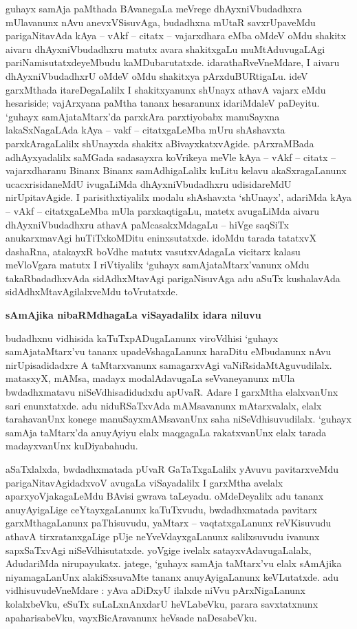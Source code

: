 guhayx samAja paMthada BAvanegaLa meVrege dhAyxniVbudadhxra mUlavanunx nAvu anevxVSisuvAga, budadhxna mUtaR savxrUpaveMdu parigaNitavAda kAya -- vAkf -- citatx -- vajarxdhara eMba oMdeV oMdu shakitx aivaru dhAyxniVbudadhxru matutx avara shakitxgaLu muMtAduvugaLAgi pariNamisutatxdeyeMbudu kaMDubarutatxde. idarathaRveVneMdare, I aivaru dhAyxniVbudadhxrU oMdeV oMdu shakitxya pArxduBURtigaLu. ideV garxMthada itareDegaLalilx I shakitxyanunx shUnayx athavA vajarx eMdu hesariside; vajArxyana paMtha tananx hesaranunx idariMdaleV paDeyitu. `guhayx samAjataMtarx'da parxkAra parxtiyobabx manuSayxna lakaSxNagaLAda kAya -- vakf -- citatxgaLeMba mUru shAshavxta parxkAragaLalilx shUnayxda shakitx aBivayxkatxvAgide. pArxraMBada adhAyxyadalilx saMGada sadasayxra koVrikeya meVle kAya -- vAkf -- citatx -- vajarxdharanu Binanx Binanx samAdhigaLalilx kuLitu kelavu akaSxragaLanunx ucacxrisidaneMdU ivugaLiMda dhAyxniVbudadhxru udisidareMdU nirUpitavAgide. I parisithxtiyalilx modalu shAshavxta `shUnayx', adariMda kAya -- vAkf -- citatxgaLeMba mUla parxkaqtigaLu, matetx avugaLiMda aivaru dhAyxniVbudadhxru athavA paMcasakxMdagaLu -- hiVge saqSiTx anukarxmavAgi huTiTxkoMDitu eninxsutatxde. idoMdu tarada tatatxvX dashaRna, atakayxR boVdhe matutx vasutxvAdagaLa vicitarx kalasu meVloVgara matutx I riVtiyalilx `guhayx samAjataMtarx'vanunx oMdu takaRbadadhxvAda sidAdhxMtavAgi parigaNisuvAga adu aSuTx kushalavAda sidAdhxMtavAgilalxveMdu toVrutatxde.

\bigskip
\begin{center}
{\Large\bf sAmAjika nibaRMdhagaLa viSayadalilx idara niluvu}
\end{center}

budadhxnu vidhisida kaTuTxpADugaLanunx viroVdhisi `guhayx samAjataMtarx'vu tananx upadeVshagaLanunx haraDitu eMbudanunx nAvu nirUpisadidadxre A taMtarxvanunx samagarxvAgi vaNiRsidaMtAguvudilalx. matasxyX, mAMsa, madayx modalAdavugaLa seVvaneyanunx mUla bwdadhxmatavu niSeVdhisadidudxdu apUvaR. Adare I garxMtha elalxvanUnx sari enunxtatxde. adu niduRSaTxvAda mAMsavanunx mAtarxvalalx, elalx tarahavanUnx konege manuSayxmAMsavanUnx saha niSeVdhisuvudilalx. `guhayx samAja taMtarx'da anuyAyiyu elalx maqgagaLa rakatxvanUnx elalx tarada madayxvanUnx kuDiyabahudu.

aSaTxlalxda, bwdadhxmatada pUvaR GaTaTxgaLalilx yAvuvu pavitarxveMdu parigaNita\-vAgidadxvoV avugaLa viSayadalilx I garxMtha avelalx aparxyoVjakagaLeMdu BAvisi gwrava taLeyadu. oMdeDeyalilx adu tananx anuyAyigaLige ceYtayxgaLanunx kaTuTxvudu, bwdadhxmatada pavitarx garxMthagaLanunx paThisuvudu, yaMtarx -- vaqtatxgaLanunx reVKisuvudu athavA tirxratanxgaLige pUje neYveVdayxgaLanunx salilxsuvudu ivanunx sapxSaTxvAgi niSeVdhisutatxde. yoVgige ivelalx satayxvAdavugaLalalx, AdudariMda nirupayukatx. jatege, `guhayx samAja taMtarx'vu elalx sAmAjika niyamagaLanUnx alakiSxsuvaMte tananx anuyAyigaLanunx keVLutatxde. adu vidhisuvudeVneMdare : yAva aDiDxyU ilalxde niVvu pArxNigaLanunx kolalxbeVku, eSuTx suLaLxnAnxdarU heVLabeVku, parara savxtatxnunx apaharisabeVku, vayxBicAravanunx heVsade naDesabeVku.

